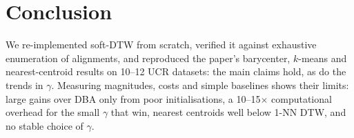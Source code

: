 \section{Conclusion}
We re-implemented soft-DTW from scratch, verified it against exhaustive enumeration of alignments, and reproduced the paper's barycenter, $k$-means and nearest-centroid results on 10--12 UCR datasets: the main claims hold, as do the trends in $\gamma$. Measuring magnitudes, costs and simple baselines shows their limits: large gains over DBA only from poor initialisations, a 10--15$\times$ computational overhead for the small $\gamma$ that win, nearest centroids well below 1-NN DTW, and no stable choice of $\gamma$. 

